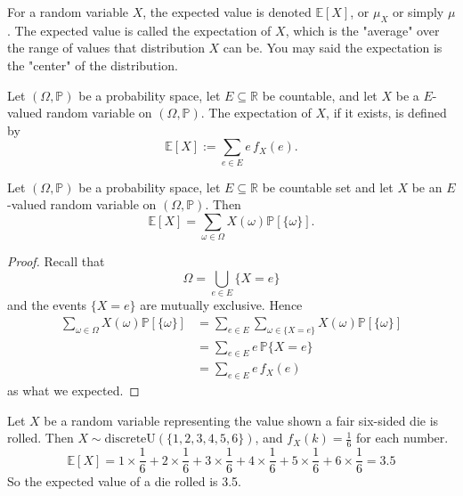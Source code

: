 For a random variable $X$, the expected value is denoted $\mathbb{E}[X]$, or $\mu_X$ or simply $\mu$.
The expected value is called the expectation of $X$, which is the "average" over the range of values 
that distribution $X$ can be. You may said the expectation is the "center" of the distribution.

\begin{definition}
    Let $(\Omega, \mathbb{P})$ be a probability space, let $E \subseteq \mathbb{R}$ be countable, 
    and let $X$ be a $E$-valued random variable on $(\Omega, \mathbb{P})$. The expectation of $X$, if it exists, is 
    defined by 
    \begin{equation}
        \mathbb{E}[X] := \sum_{e \in E} e\, f_X(e).
    \end{equation}
\end{definition}

\begin{lemma}
    Let $(\Omega, \mathbb{P})$ be a probability space, let $E \subseteq \mathbb{R}$ be countable set and 
    let $X$ be an $E$-valued random variable on $(\Omega, \mathbb{P})$. Then 
    \[
        \mathbb{E}[X] = \sum_{\omega \in \Omega} X(\omega) \mathbb{P}[\{ \omega \}].
    \]
\end{lemma}
\begin{proof}
    Recall that 
    \[
        \Omega = \bigcup_{e \in E} \{ X = e \}
    \]
    and the events $\{ X = e \}$ are mutually exclusive. Hence
    \begin{align*}
        \sum_{\omega \in \Omega} X(\omega) \mathbb{P}[\{ \omega \}] &= 
        \sum_{e \in E} \sum_{\omega \in \{X = e\} } X(\omega) \mathbb{P}[\{ \omega \}]\\
        &= \sum_{e \in E} e \, \mathbb{P}\{ X = e \}\\
        &= \sum_{e \in E} e\, f_X(e)
    \end{align*}
    as what we expected.
\end{proof}

\begin{example}
    Let $X$ be a random variable representing the value shown a fair six-sided die is rolled.
    Then $X \sim \text{discreteU}(\{1,2,3,4,5,6\})$, and $f_X(k) = \frac{1}{6}$ for each number.
    \[
        \mathbb{E}[X] = 1 \times \frac{1}{6} + 2 \times \frac{1}{6} + 3 \times \frac{1}{6} 
        + 4 \times \frac{1}{6} + 5 \times \frac{1}{6} + 6 \times \frac{1}{6} = 3.5
    \]
    So the expected value of a die rolled is 3.5.
\end{example}

